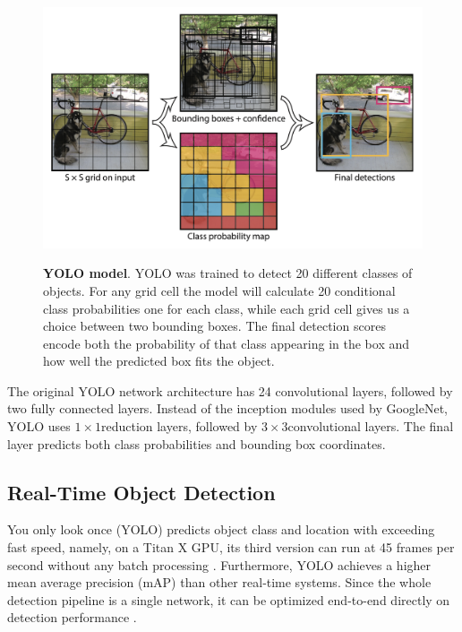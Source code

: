 \begin{figure}[t]
\begin{center}
\centering
\includegraphics[width=\textwidth]{thesis-template-master/images/yolomodel.png}
\label{fig:cellnet}
\end{center}
\caption{\textbf{YOLO model\cite{yolov1}}. YOLO\cite{yolov1} was trained to detect 20 different classes of objects. For any grid cell the model will calculate 20 conditional class probabilities one for each class, while each grid cell gives us a choice between two bounding boxes. The final detection scores encode both the probability of that class appearing in the box and how well the predicted box fits the object.}
\label{fig:2.3}
\end{figure}


 The original  YOLO network architecture has 24 convolutional layers, followed by two fully connected layers\cite{yolov1}. Instead of the inception modules used by GoogleNet, YOLO uses $1 \times 1 $reduction layers, followed by $3 \times3 $convolutional layers. The final layer predicts both class probabilities and bounding box coordinates.


\subsection{ Real-Time Object Detection }

You only look once (YOLO) predicts object class and location with exceeding fast speed, namely, on a Titan X GPU, its third version can run at 45 frames per second without any batch processing \cite{18}. Furthermore, YOLO achieves a higher mean average precision (mAP) than other real‐time systems. Since the whole detection pipeline is a single network, it can be optimized end-to-end directly on detection performance \cite{18}.

